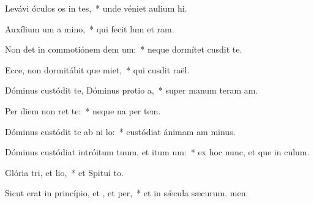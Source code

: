 \item Levávi óculos os in tes,~* unde véniet aulium hi.
\item Auxílium um a mino,~* qui fecit lum et ram.
\item Non det in commotiónem dem um:~* neque dormítet  cusdit te.
\item Ecce, non dormitábit que miet,~* qui cusdit raël.
\item Dóminus custódit te, Dóminus protio a,~* super manum teram am.
\item Per diem  non ret te:~* neque na per tem.
\item Dóminus custódit te ab ni lo:~* custódiat ánimam am minus.
\item Dóminus custódiat intróitum tuum, et itum um:~* ex hoc nunc, et que in culum.
\item Glória tri, et lio,~* et Spitui to.
\item Sicut erat in princípio, et , et per,~* et in sǽcula sæcurum. men.
